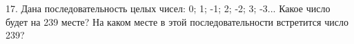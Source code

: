 17. Дана последовательность целых чисел: 0; 1; -1; 2; -2; 3; -3... Какое число будет на 239 месте? На каком месте в этой последовательности встретится число 239?\\
